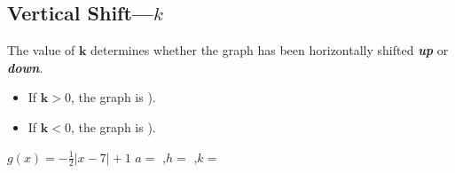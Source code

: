 \subsection{Vertical Shift---$k$}

The value of $\bm{k}$ determines whether the graph 
has been horizontally shifted {\bfseries\itshape up} or {\bfseries\itshape down}.
\begin{itemize}[topsep=-0.5\parskip]
    \item If $\bm{k}>0$, the graph is  ).
    \item If $\bm{k}<0$, the graph is  ).
\end{itemize}



{
    $g(x) = -\frac{1}{2}|x-7| + 1$
    \tcblower
    ${a} =$ ,\quad ${h} =$ ,\quad ${k} =$ 
    \vspace{1.25in}
}
